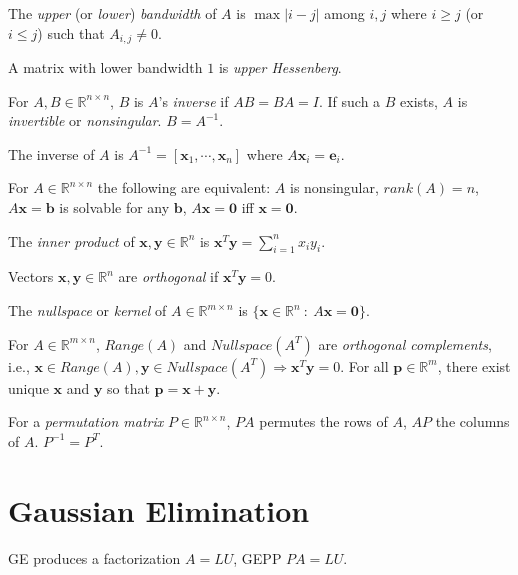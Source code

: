 \documentclass[landscape,10pt,letterpaper]{article}
\newcommand{\heading}[1]{\vspace{-1.5em} \section*{#1} \vspace{-1.0em}}
\begin{document}
\begin{multicols}{4}
The \emph{upper} (or \emph{lower}) \emph{bandwidth} of $A$ is $\max | i-j |$ among $i,j$ where $i\geq j$ (or $i\leq j$) such that $A_{i,j} \neq 0$.

A matrix with lower bandwidth $1$ is \emph{upper Hessenberg}.

For $A,B \in \mathbb{R}^{n \times n}$, $B$ is $A$'s \emph{inverse} if $AB=BA=I$.  If such a $B$ exists, $A$ is \emph{invertible} or \emph{nonsingular}. $B=A^{-1}$.

The inverse of $A$ is $A^{-1}=\left[ \mathbf{x}_1, \cdots, \mathbf{x}_n \right]$ where $A \mathbf{x}_i = \mathbf{e}_i$.

For $A \in \mathbb{R}^{n \times n}$ the following are equivalent: $A$ is nonsingular, $rank(A)=n$, $A\mathbf{x}=\mathbf{b}$ is solvable for any $\mathbf{b}$, $A\mathbf{x}=\mathbf{0}$ iff $\mathbf{x}=\mathbf{0}$.


The \emph{inner product} of $\mathbf{x}, \mathbf{y} \in \mathbb{R}^n$ is $\mathbf{x}^T \mathbf{y} = \sum_{i=1}^n x_i y_i$.

Vectors $\mathbf{x}, \mathbf{y} \in \mathbb{R}^n$ are \emph{orthogonal} if $\mathbf{x}^T \mathbf{y} = 0$.

The \emph{nullspace} or \emph{kernel} of $A \in \mathbb{R}^{m \times n}$ is $\{ \mathbf{x} \in \mathbb{R}^n\ :\ A \mathbf{x} = \mathbf{0} \}$.

For $A \in \mathbb{R}^{m \times n}$, $Range(A)$ and $Nullspace(A^T)$ are \emph{orthogonal complements}, i.e., $\mathbf{x} \in Range(A), \mathbf{y} \in Nullspace(A^T) \Rightarrow \mathbf{x}^T\mathbf{y} = 0$.  For all $\mathbf{p} \in \mathbb{R}^m$, there exist unique $\mathbf{x}$ and $\mathbf{y}$ so that $\mathbf{p} = \mathbf{x} + \mathbf{y}$.


For a \emph{permutation matrix} $P \in \mathbb{R}^{n \times n}$, $PA$ permutes the rows of $A$, $AP$ the columns of $A$.  $P^{-1} = P^T$.

\heading{Gaussian Elimination}

GE produces a factorization $A = LU$, GEPP $PA = LU$.


\end{multicols}
\end{document}
